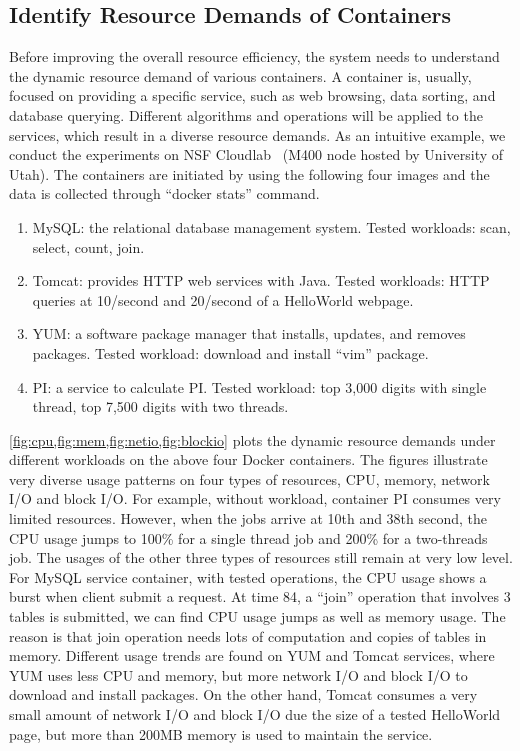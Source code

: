\subsection{Identify Resource Demands of Containers}
\label{understand}
Before improving the overall resource efficiency, the system needs to understand the dynamic resource demand of various containers. 
A container is, usually, focused on providing a specific service, such as web browsing, data sorting, and database querying. 
Different algorithms and operations will be applied to the services, which result in a diverse resource demands.
As an intuitive example, we conduct the experiments on NSF Cloudlab~\cite{cloudlab} (M400 node hosted by University of Utah).
The containers are initiated by using the following four images and the data is collected through ``docker stats'' command.
\begin{enumerate}
 \item MySQL: the relational database management system. Tested workloads: scan, select, count, join.
 \item Tomcat: provides HTTP web services with Java. Tested workloads: HTTP queries at 10/second and 20/second of a HelloWorld webpage.
 \item YUM: a software package manager that installs, updates, and removes packages. Tested workload: download and install ``vim'' package. 
 \item PI: a service to calculate PI. Tested workload: top 3,000 digits with single thread, top 7,500 digits with two threads.
\end{enumerate}  
\cref{fig:cpu,fig:mem,fig:netio,fig:blockio} plots the dynamic resource demands under different workloads on the above four Docker containers.
The figures illustrate very diverse usage patterns on four types of resources, CPU, memory, network I/O and block I/O.
For example, without workload, container PI consumes very limited resources. However, when the jobs arrive at 10th and 38th second, the CPU usage
jumps to 100\% for a single thread job and 200\% for a two-threads job. The usages of the other three types of resources still remain at very low level.
For MySQL service container, with tested operations, the CPU usage shows a burst when client submit a request. At time 84, a ``join'' operation that involves
3 tables is submitted, we can find CPU usage jumps as well as memory usage. The reason is that join operation needs lots of computation and copies
of tables in memory. Different usage trends are found on YUM and Tomcat services, where YUM uses less CPU and memory, but more network I/O and block I/O to
download and install packages. On the other hand,
Tomcat consumes a very small amount of network I/O and block I/O due the size of a tested HelloWorld page, but more than 200MB memory is used to maintain the 
service. 



